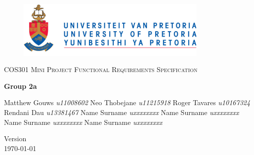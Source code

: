 \begin{titlepage}
	\begin{center}
		
		\begin{figure}[t]
			\centering
			\includegraphics[width=350px]{UP_Logo.png}
		\end{figure}
		
		\textsc{\LARGE COS301 Mini Project Functional \newline\newline Requirements Specification}
		
		\textbf{\newline Group 2a} \\
		\begin{flushright} \large
			Matthew Gouws \emph{u11008602} \newline
			Neo Thobejane \emph{u11215918} \newline
			Roger Tavares \emph{u10167324} \newline
			Rendani Dau \emph{u13381467} \newline
			Name Surname \emph{uxxxxxxxx} \newline
			Name Surname \emph{uxxxxxxxx} \newline
			Name Surname \emph{uxxxxxxxx} \newline
			Name Surname \emph{uxxxxxxxx} \newline
		\end{flushright}
		
		\vfill
		
		{\large Version }
		\\
		{\large \today}
		
	\end{center}
\end{titlepage}
